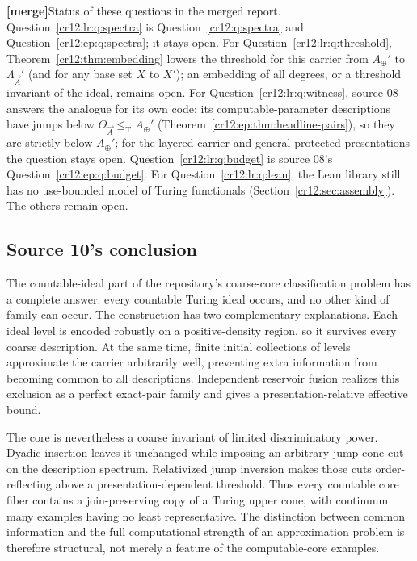 \documentclass[11pt,letterpaper]{article}
\theoremstyle{plain}
\theoremstyle{definition}
\theoremstyle{remark}
\numberwithin{equation}{section}
\newcommand{\leT}{\leq_{\mathrm T}}
\newcommand{\mergenote}[1]{\par\smallskip\noindent
 {\small\textsf{\textbf{[merge]}}\enspace #1}\par\smallskip}
\newcommand{\Aplus}{A_{\oplus}}          %
\newcommand{\Lam}{\Lambda_{\vec A}}      %
\begin{document}
\mergenote{Status of these questions in the merged report.
Question~\ref{cr12:lr:q:spectra} is Question~\ref{cr12:q:spectra} and
Question~\ref{cr12:ep:q:spectra}; it stays open. For
Question~\ref{cr12:lr:q:threshold}, Theorem~\ref{cr12:thm:embedding} lowers the
threshold for this carrier from $\Aplus'$ to $\Lam'$ (and for any base set $X$ to
$X'$); an embedding of all degrees, or a threshold invariant of the ideal, remains
open. For Question~\ref{cr12:lr:q:witness}, source 08 answers the analogue for its
own code: its computable-parameter descriptions have jumps below
$\Theta_{\vec A}\leT\Aplus'$ (Theorem~\ref{cr12:ep:thm:headline-pairs}), so they are
strictly below $\Aplus'$; for the layered carrier and general protected presentations
the question stays open. Question~\ref{cr12:lr:q:budget} is source 08's
Question~\ref{cr12:ep:q:budget}. For Question~\ref{cr12:lr:q:lean}, the Lean library
still has no use-bounded model of Turing functionals (Section~\ref{cr12:sec:assembly}).
The others remain open.}

\subsection{Source 10's conclusion}\label{cr12:lr:sec:conclusion}
The countable-ideal part of the repository's coarse-core classification problem has a
complete answer: every countable Turing ideal occurs, and no other kind of family can
occur. The construction has two complementary explanations. Each ideal level is
encoded robustly on a positive-density region, so it survives every coarse
description. At the same time, finite initial collections of levels approximate the
carrier arbitrarily well, preventing extra information from becoming common to all
descriptions. Independent reservoir fusion realizes this exclusion as a perfect
exact-pair family and gives a presentation-relative effective bound.

The core is nevertheless a coarse invariant of limited discriminatory power. Dyadic
insertion leaves it unchanged while imposing an arbitrary jump-cone cut on the
description spectrum. Relativized jump inversion makes those cuts order-reflecting
above a presentation-dependent threshold. Thus every countable core fiber contains a
join-preserving copy of a Turing upper cone, with continuum many examples having no
least representative. The distinction between common information and the full
computational strength of an approximation problem is therefore structural, not merely
a feature of the computable-core examples.
\end{document}
